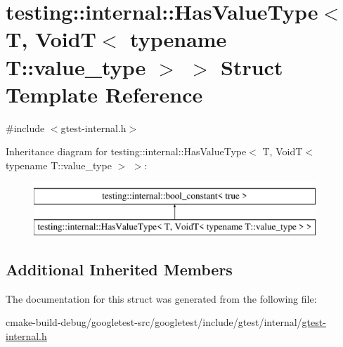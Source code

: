 \hypertarget{structtesting_1_1internal_1_1HasValueType_3_01T_00_01VoidT_3_01typename_01T_1_1value__type_01_4_01_4}{}\section{testing\+::internal\+::Has\+Value\+Type$<$ T, VoidT$<$ typename T\+::value\+\_\+type $>$ $>$ Struct Template Reference}
\label{structtesting_1_1internal_1_1HasValueType_3_01T_00_01VoidT_3_01typename_01T_1_1value__type_01_4_01_4}


{\ttfamily \#include $<$gtest-\/internal.\+h$>$}

Inheritance diagram for testing\+::internal\+::Has\+Value\+Type$<$ T, VoidT$<$ typename T\+::value\+\_\+type $>$ $>$\+:\begin{figure}[H]
\begin{center}
\leavevmode
\includegraphics[height=2.000000cm]{structtesting_1_1internal_1_1HasValueType_3_01T_00_01VoidT_3_01typename_01T_1_1value__type_01_4_01_4}
\end{center}
\end{figure}
\subsection*{Additional Inherited Members}


The documentation for this struct was generated from the following file\+:\begin{DoxyCompactItemize}
\item 
cmake-\/build-\/debug/googletest-\/src/googletest/include/gtest/internal/\mbox{\hyperlink{gtest-internal_8h}{gtest-\/internal.\+h}}\end{DoxyCompactItemize}
